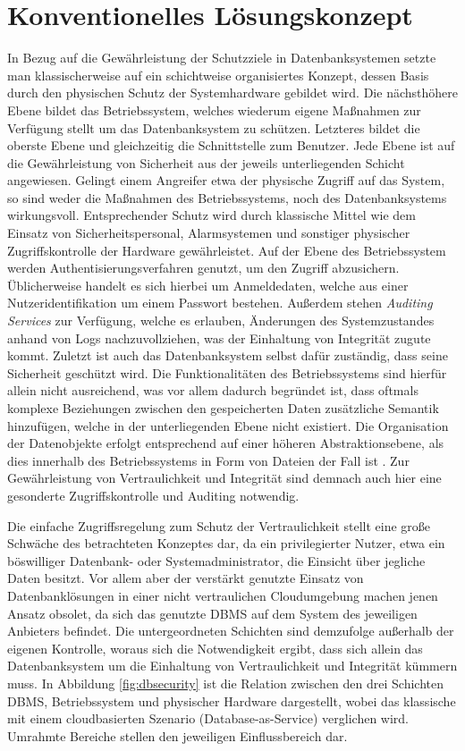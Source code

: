 \section{Konventionelles Lösungskonzept}

In Bezug auf die Gewährleistung der Schutzziele in Datenbanksystemen setzte man klassischerweise auf ein schichtweise organisiertes Konzept, dessen Basis durch den physischen Schutz der Systemhardware gebildet wird. Die nächsthöhere Ebene bildet das Betriebssystem, welches wiederum eigene Maßnahmen zur Verfügung stellt um das Datenbanksystem zu schützen. Letzteres bildet die oberste Ebene und gleichzeitig die Schnittstelle zum Benutzer. Jede Ebene ist auf die Gewährleistung von Sicherheit aus der jeweils unterliegenden Schicht angewiesen. Gelingt einem Angreifer etwa der physische Zugriff auf das System, so sind weder die Maßnahmen des Betriebssystems, noch des Datenbanksystems wirkungsvoll. Entsprechender Schutz wird durch klassische Mittel wie dem Einsatz von Sicherheitspersonal, Alarmsystemen und sonstiger physischer Zugriffskontrolle der Hardware gewährleistet. Auf der Ebene des Betriebssystem werden Authentisierungsverfahren genutzt, um den Zugriff abzusichern. Üblicherweise handelt es sich hierbei um Anmeldedaten, welche aus einer Nutzeridentifikation um einem Passwort bestehen. Außerdem stehen \textit{Auditing Services} zur Verfügung, welche es erlauben, Änderungen des Systemzustandes anhand von Logs nachzuvollziehen, was der Einhaltung von Integrität zugute kommt. Zuletzt ist auch das Datenbanksystem selbst dafür zuständig, dass seine Sicherheit geschützt wird. Die Funktionalitäten des Betriebssystems sind hierfür allein nicht ausreichend, was vor allem dadurch begründet ist, dass oftmals komplexe Beziehungen zwischen den gespeicherten Daten zusätzliche Semantik hinzufügen, welche in der unterliegenden Ebene nicht existiert. Die Organisation der Datenobjekte erfolgt entsprechend auf einer höheren Abstraktionsebene, als dies innerhalb des Betriebssystems in Form von Dateien der Fall ist \cite{Vimercati2001}. Zur Gewährleistung von Vertraulichkeit und Integrität sind demnach auch hier eine gesonderte Zugriffskontrolle und Auditing notwendig.

Die einfache Zugriffsregelung zum Schutz der Vertraulichkeit stellt eine große Schwäche des betrachteten Konzeptes dar, da ein privilegierter Nutzer, etwa ein böswilliger Datenbank- oder Systemadministrator, die Einsicht über jegliche Daten besitzt. Vor allem aber der verstärkt genutzte Einsatz von Datenbanklösungen in einer nicht vertraulichen Cloudumgebung machen jenen Ansatz obsolet, da sich das genutzte DBMS auf dem System des jeweiligen Anbieters befindet. Die untergeordneten Schichten sind demzufolge außerhalb der eigenen Kontrolle, woraus sich die Notwendigkeit ergibt, dass sich allein das Datenbanksystem um die Einhaltung von Vertraulichkeit und Integrität kümmern muss. In Abbildung \ref{fig:dbsecurity} ist die Relation zwischen den drei Schichten DBMS, Betriebssystem und physischer Hardware dargestellt, wobei das klassische mit einem cloudbasierten Szenario (Database-as-Service) verglichen wird. Umrahmte Bereiche stellen den jeweiligen Einflussbereich dar.

